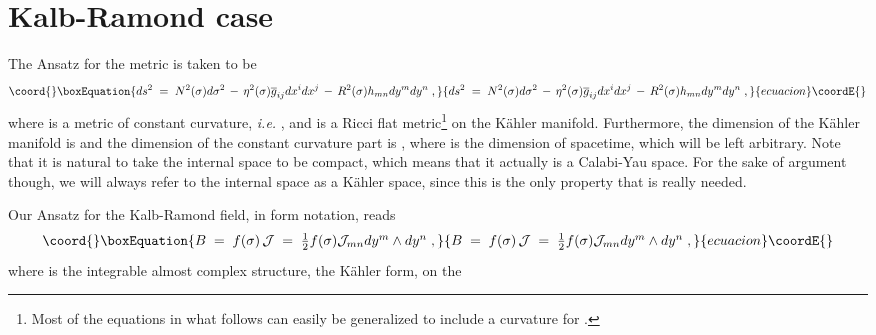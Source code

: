 \documentclass[a4paper,11pt]{article}
\begin{document}
\section{Kalb-Ramond case}
\label{sec:H}
\par
The Ansatz for the metric is taken to be
\begin{equation}\coord{}\boxEquation{
ds^{2}\;=\; N^{2}(\sigma )d\sigma^{2}
      \,-\,\eta^{2}(\sigma )\overline{g}_{ij}dx^{i}dx^{j}
      \,-\, R^{2}(\sigma )h_{mn}dy^{m}dy^{n} \; ,
\label{eq:AnsatzG}
}{
ds^{2}\;=\; N^{2}(\sigma )d\sigma^{2}
      \,-\,\eta^{2}(\sigma )\overline{g}_{ij}dx^{i}dx^{j}
      \,-\, R^{2}(\sigma )h_{mn}dy^{m}dy^{n} \; ,
}{ecuacion}\coordE{}\end{equation}
where \coordHE{} is a metric of constant curvature, {\em i.e.}
\coordHE{}, and \coordHE{} is
a Ricci flat metric\footnote{Most of the equations in what follows can
easily be generalized to include a curvature for \coordHE{}.}
on the K\"ahler manifold.
Furthermore, the dimension
of the K\"ahler manifold is \coordHE{} and the dimension of the constant 
curvature part is \coordHE{}, where \coordHE{} is the dimension 
of spacetime, which will be left arbitrary.
Note that it is natural to take the internal space to be compact,
which means that it actually is a Calabi-Yau space. 
For the sake of argument though, we will always refer to the internal
space as a K\"ahler space, since this is the only property that is 
really needed.
\par
%
Our Ansatz for the Kalb-Ramond field, in form notation, reads
\begin{equation}\coord{}\boxEquation{
  B \;=\; f(\sigma )\, \mathcal{J} 
    \;=\; \textstyle{\frac{1}{2}} f(\sigma )
               \mathcal{J}_{mn} dy^{m}\wedge dy^{n}
    \; ,
}{
  B \;=\; f(\sigma )\, \mathcal{J} 
    \;=\; \textstyle{\frac{1}{2}} f(\sigma )
               \mathcal{J}_{mn} dy^{m}\wedge dy^{n}
    \; ,
}{ecuacion}\coordE{}\end{equation}
where \coordHE{} is the integrable 
almost complex structure, the K\"ahler form, on the
\end{document}
